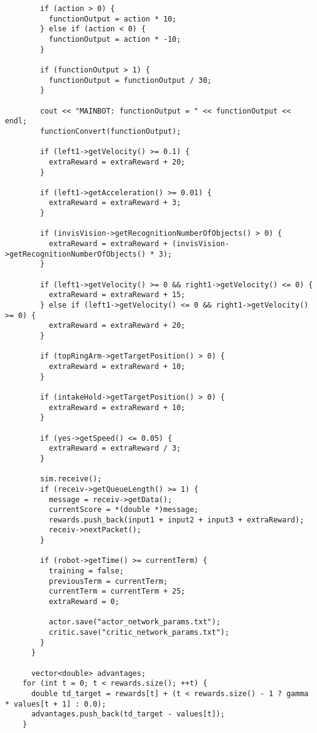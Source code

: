 \begin{verbatim}
        if (action > 0) {
          functionOutput = action * 10;
        } else if (action < 0) {
          functionOutput = action * -10;
        }
 
        if (functionOutput > 1) {
          functionOutput = functionOutput / 30;
        }
 
        cout << "MAINBOT: functionOutput = " << functionOutput << endl;
        functionConvert(functionOutput);
 
        if (left1->getVelocity() >= 0.1) {
          extraReward = extraReward + 20;
        }
 
        if (left1->getAcceleration() >= 0.01) {
          extraReward = extraReward + 3;
        }
 
        if (invisVision->getRecognitionNumberOfObjects() > 0) {
          extraReward = extraReward + (invisVision->getRecognitionNumberOfObjects() * 3);
        }
 
        if (left1->getVelocity() >= 0 && right1->getVelocity() <= 0) {
          extraReward = extraReward + 15;
        } else if (left1->getVelocity() <= 0 && right1->getVelocity() >= 0) {
          extraReward = extraReward + 20;
        }
 
        if (topRingArm->getTargetPosition() > 0) {
          extraReward = extraReward + 10;
        }
 
        if (intakeHold->getTargetPosition() > 0) {
          extraReward = extraReward + 10;
        }
 
        if (yes->getSpeed() <= 0.05) {
          extraReward = extraReward / 3;
        }
 
        sim.receive();
        if (receiv->getQueueLength() >= 1) {
          message = receiv->getData();
          currentScore = *(double *)message;
          rewards.push_back(input1 + input2 + input3 + extraReward);
          receiv->nextPacket();
        }
 
        if (robot->getTime() >= currentTerm) {
          training = false;
          previousTerm = currentTerm;
          currentTerm = currentTerm + 25;
          extraReward = 0;
 
          actor.save("actor_network_params.txt");
          critic.save("critic_network_params.txt");
        }
      }
 
      vector<double> advantages;
    for (int t = 0; t < rewards.size(); ++t) {
      double td_target = rewards[t] + (t < rewards.size() - 1 ? gamma * values[t + 1] : 0.0);
      advantages.push_back(td_target - values[t]);
    }
 

\end{verbatim}
